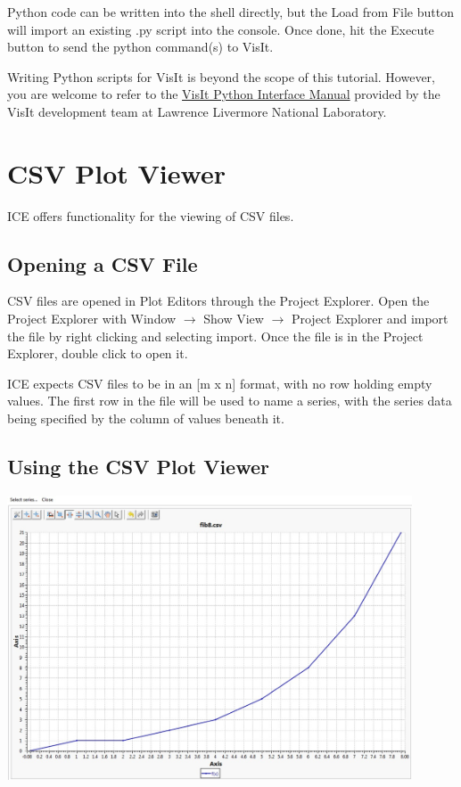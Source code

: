 \documentclass{article}
\begin{document}
Python code can be written into the shell directly, but the Load from File
button will import an existing .py script into the console. Once done, hit the
Execute button to send the python command(s) to VisIt.

Writing Python scripts for VisIt is beyond the scope of this tutorial. However,
you are welcome to refer to the
\href{https://wci.llnl.gov/simulation/computer-codes/visit/manuals}{VisIt Python
Interface Manual} provided by the VisIt development team at Lawrence Livermore
National Laboratory.

\section{CSV Plot Viewer}

ICE offers functionality for the viewing of CSV files. 

\subsection{Opening a CSV File}

CSV files are opened in Plot Editors through the Project Explorer. Open the
Project Explorer with Window $\rightarrow$ Show View $\rightarrow$ Project
Explorer and import the file by right clicking and selecting import. Once the
file is in the Project Explorer, double click to open it.

ICE expects CSV files to be in an [m x n] format, with no row holding empty
values. The first row in the file will be used to name a series, with the series
data being specified by the column of values beneath it.

\subsection{Using the CSV Plot Viewer}

\begin{center}
\includegraphics[width=12cm]{images/CSVPlotViewer}
\end{center}
\end{document}
